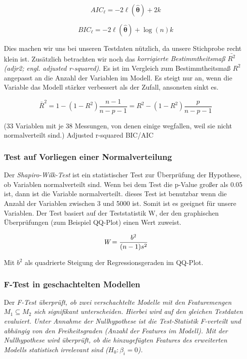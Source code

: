 $$\displaystyle AIC_{\ell }=-2\ell (\mathbf {\hat {\theta }} )+2k$$

$$\displaystyle BIC_{\ell }=-2\ell (\mathbf {\hat {\theta }} )+\log(n)k$$

Dies machen wir uns bei unseren Testdaten nützlich, da unsere Stichprobe recht klein ist. Zusätzlich betrachten wir noch das \emph{korrigierte Bestimmtheitsmaß  $\bar{R^2}$ (adjr2; engl. \it{adjusted r-squared})}. Es ist im Vergleich zum Bestimmtheitsmaß $R^2$ angepasst an die Anzahl der Variablen im Modell. Es steigt nur an, wenn die Variable das Modell stärker verbessert als der Zufall, ansonsten sinkt es.

$$\bar R^2 = 1- (1-R^2) \frac{n-1}{n-p-1} = R^2 - (1-R^2) \frac{p}{n-p-1}$$

(33 Variablen mit je 38 Messungen, von denen einige wegfallen, weil sie nicht normalverteilt sind.)
Adjusted r-squared
BIC/AIC

\subsubsection{Test auf Vorliegen einer Normalverteilung}

Der \emph{Shapiro-Wilk-Test} ist ein statistischer Test zur Überprüfung der Hypothese, ob Variablen normalverteilt sind. Wenn bei dem Test die p-Value großer als 0.05 ist, dann ist die Variable normalverteilt.
dieses Test ist benutzbar wenn die Anzahl der Variablen zwischen 3 und 5000 ist. Somit ist es geeignet für unsere Variablen. Der Test basiert auf der Teststatistik W, der den graphischen Überprüfungen (zum Beispiel QQ-Plot) einen Wert zuweist.

$$\textit{W} = {{b^2}\over {(n-1)s^2}}$$


Mit $b^2$ als quadrierte Steigung der Regressionsgeraden im QQ-Plot.\cite{2012shapiro}

\subsubsection{F-Test in geschachtelten Modellen}
Der \it{F-Test} überprüft, ob zwei verschachtelte Modelle mit den Featuremengen $M_1 \subseteq M_2$ sich signifikant unterscheiden.
Hierbei wird auf den gleichen Testdaten evaluiert.
Unter Annahme der Nullhypothese ist die Test-Statistik F-verteilt und abhängig von den Freiheitsgraden (Anzahl der Features im Modell).
Mit der Nullhypothese wird überprüft, ob die hinzugefügten Features des erweiterten Modells statistisch irrelevant sind ($H_0: \beta_i = 0$).

